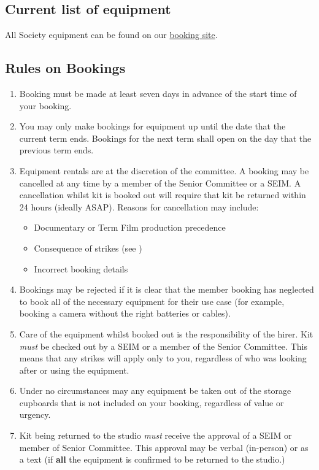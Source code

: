 \documentclass[]{article}
\begin{document}
\subsection{Current list of equipment}
All Society equipment can be found on our \href{https://ucl-film-tv-society.booqable.shop/}{booking site}.
\subsection{Rules on Bookings}
\begin{enumerate}
    \item Booking must be made at least seven days in advance of the start time of your booking.
    \item You may only make bookings for equipment up until the date that the current term ends. Bookings for the next term shall open on the day that the previous term ends.
    \item Equipment rentals are at the discretion of the committee. A booking may be cancelled at any time by a member of the Senior Committee or a SEIM. A cancellation whilst kit is booked out will require that kit be returned within 24 hours (ideally ASAP). Reasons for cancellation may include:
          \begin{itemize}
              \item Documentary or Term Film production precedence
              \item Consequence of strikes (see )
              \item Incorrect booking details
          \end{itemize}
    \item Bookings may be rejected if it is clear that the member booking has neglected to book all of the necessary equipment for their use case (for example, booking a camera without the right batteries or cables).
    \item Care of the equipment whilst booked out is the responsibility of the hirer. Kit \textit{must} be checked out by a SEIM or a member of the Senior Committee. This means that any strikes will apply only to you, regardless of who was looking after or using the equipment.
    \item Under no circumstances may any equipment be taken out of the storage cupboards that is not included on your booking, regardless of value or urgency.
    \item Kit being returned to the studio \textit{must} receive the approval of a SEIM or member of Senior Committee. This approval may be verbal (in-person) or as a text (if \textbf{all} the equipment is confirmed to be returned to the studio.) 

\end{enumerate}
\end{document}

